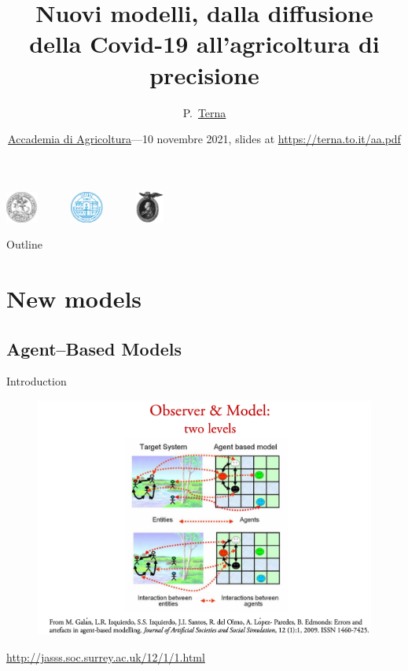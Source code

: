 \documentclass[9pt]{beamer}
\title[Nuovi modelli] %
{Nuovi modelli, dalla diffusione della Covid-19 all'agricoltura di precisione}
\author[] %
{P.~\href{https://terna.to.it}{Terna}\inst{1~2~3}  }
\institute[] %
{
  \inst{1}%
 University of Torino, Italy
  \and
 \inst{2}%
  Fondazione Collegio Carlo Alberto, Honorary Fellow, Italy
  \and
  \inst{3}%
  Accademia di Agricoltura, Torino, Italy
 }
\date[] %
{\href{http://www.accademiadiagricoltura.it}{Accademia di Agricoltura}---10 novembre  2021, slides at \url{https://terna.to.it/aa.pdf}}
\begin{document}
\begin{frame}

\includegraphics[width=0.08\textwidth]{logo2_unito.png}~~~~~~\includegraphics[width=0.08\textwidth]{CCA_Logo2.png}~~~~~~\includegraphics[width=0.07\textwidth]{A_agr.jpeg}


\titlepage


\end{frame}

\begin{frame}{Outline}

  \tableofcontents
\end{frame}

\section{New models}

\subsection{Agent--Based Models}

\begin{frame}{Introduction}

\begin{figure}[H]
\center
\includegraphics[scale=0.27]{abm1.png}
\label{abmPicture}
\end{figure}
\url{http://jasss.soc.surrey.ac.uk/12/1/1.html}

\end{frame}
\end{document}
